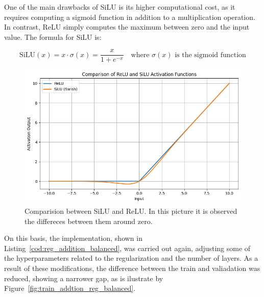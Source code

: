 One of the main drawbacks of SiLU is its higher computational cost, as it requires computing a sigmoid function in addition to a multiplication operation. In contrast, ReLU simply computes the maximum between zero and the input value. The formula for SiLU is:

\[
\text{SiLU}(x) = x \cdot \sigma(x) = \frac{x}{1 + e^{-x}} \quad \text{where } \sigma(x) \text{ is the sigmoid function}
\]

\begin{figure}[H]
    \centering
    \includegraphics[width=1\textwidth]{figures/neural_net_regression_research/reluSilucomparison.png}
    \caption{ Comparision between SiLU and ReLU. In this picture it is observed the differeces between them around zero.}
    \label{fig:compararisionSiluRelu}
\end{figure}

On this basis, the implementation, shown in Listing~\ref{cod:reg_addition_balanced}, was carried out again, adjusting some of the hyperparameters related to the regularization and the number of layers. As a result of these modifications, the difference between the train and valiadation was reduced, showing a narrower gap, as is ilustrate by Figure~\ref{fig:train_addtion_reg_balanced}.

